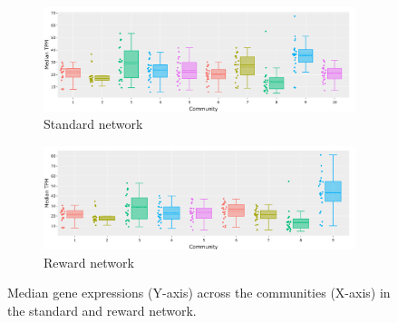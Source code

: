 \begin{figure}[H]
    \centering
    \begin{subfigure}[!t]{1.0\textwidth}
    \includegraphics[width=\textwidth,keepaspectratio]{Sections/Network_I/Resources/P0/Comms/P0_standard_4K_50TF_med.png}
        \caption{Standard network}
        \label{fig:ap:p0_chg_std_exp}
    \end{subfigure}
    \begin{subfigure}[!t]{1.0\textwidth}
        \includegraphics[width=\textwidth,keepaspectratio]{Sections/Network_I/Resources/P0/Comms/P0_norm3_4K_50TF_med.png}
            \caption{Reward network}
            \label{fig:ap:p0_chg_rwd_exp}
    \end{subfigure}
    \caption[P0 tum: median expression in P0 communities]{Median gene expressions (Y-axis) across the communities (X-axis) in the standard and reward network.}
    \label{fig:ap:p0_ge_chgs}
\end{figure}

\newpage
